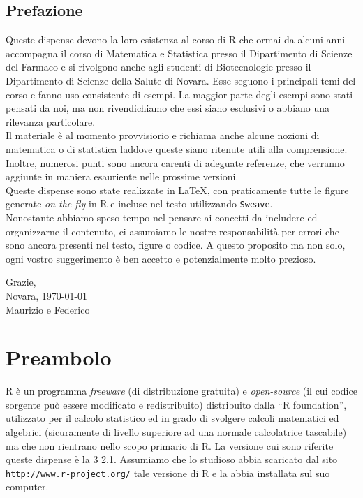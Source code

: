 \documentclass[onecolumn,11pt]{book}
\author{Federico Comoglio e  Maurizio Rinaldi}
\begin{document}

\markright{\today}
\thispagestyle{empty} 
\maketitle
\newpage
\thispagestyle{empty} 
\tableofcontents
\newpage
\thispagestyle{empty} 
 \mainmatter
\section*{Prefazione}
\rhead{}
Queste dispense devono la loro  esistenza al corso di \textsf{R} che ormai da alcuni anni accompagna il corso di Matematica e Statistica presso il Dipartimento di Scienze del Farmaco e si rivolgono anche agli studenti di Biotecnologie presso il Dipartimento di Scienze della Salute di Novara. Esse seguono i principali temi del corso e fanno uso consistente di esempi. La maggior parte degli esempi sono stati pensati da noi, ma non rivendichiamo che essi siano esclusivi o abbiano una rilevanza particolare.\\
Il materiale \`e al  momento provvisiorio e richiama anche alcune nozioni di matematica o di statistica laddove queste siano ritenute utili alla comprensione.
Inoltre, numerosi punti sono ancora carenti di adeguate referenze, che verranno aggiunte in maniera esauriente nelle prossime versioni.\\
Queste dispense sono state realizzate in \LaTeX, con praticamente tutte le figure generate \textit{on the fly} in \textsf{R} e incluse nel testo utilizzando \texttt{Sweave}.\\
Nonostante abbiamo speso tempo nel pensare ai concetti da includere ed organizzarne il contenuto, ci assumiamo le nostre responsabilit\`a per errori che sono ancora presenti nel testo, figure o codice. A questo proposito ma non solo, ogni vostro suggerimento \`e ben accetto e potenzialmente molto prezioso.\\
\begin{flushright}
Grazie,\\
Novara, \today \\ 
Maurizio e Federico
\end{flushright}
\vfill\eject
 \thispagestyle{empty} 
\chapter{Preambolo}
{\textsf R} \`e un programma \textit{freeware} (di distribuzione gratuita) e \textit{open-source} (il cui codice sorgente pu\`o essere modificato e redistribuito) distribuito dalla ``\textsf{R} foundation'', utilizzato per il calcolo statistico ed in grado di svolgere calcoli matematici ed algebrici (sicuramente di livello superiore ad una normale calcolatrice tascabile) ma che non rientrano nello scopo primario di \textsf{R}. 
La versione cui sono riferite queste dispense \`e la  
3 2.1.
 Assumiamo che lo studioso abbia scaricato dal sito  \texttt{http://www.r-project.org/} tale versione di  \textsf{R} e la abbia installata sul suo computer.
\end{document}
